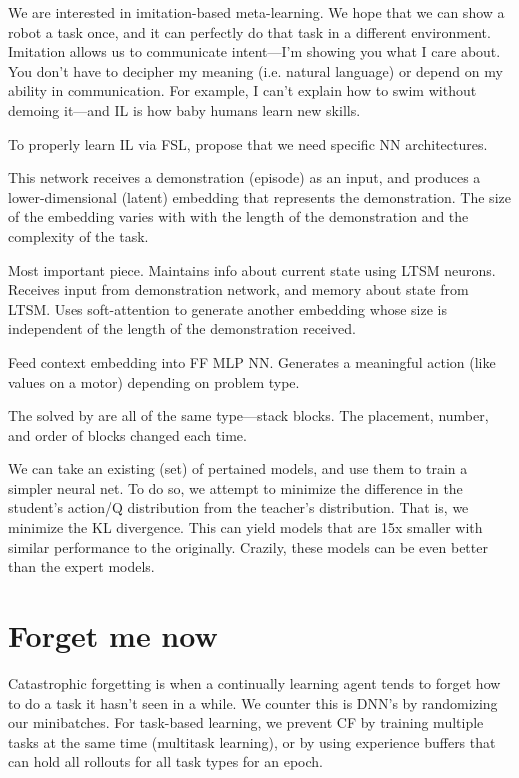 \documentclass[american]{IEEEtran}   	%
\begin{document}
We are interested in imitation-based meta-learning\cite{duan2017oneshot}.
We hope that we can show a robot a task once, and it can perfectly do that task in a different environment.
Imitation allows us to communicate intent---I'm showing you what I care about.
You don't have to decipher my meaning (i.e. natural language) or depend on my ability in communication.
For example, I can't explain how to swim without demoing it---and IL is how baby humans learn new skills.

To properly learn IL via FSL, \cite{duan2017oneshot} propose that we need specific NN architectures.
\begin{description}[leftmargin=1cm, style=nextline]
	\item[Demonstration Network]
	This network receives a demonstration (episode) as an input, and produces a lower-dimensional (latent) embedding that represents the demonstration.
	The size of the embedding varies with with the length of the demonstration and the complexity of the task.
	
	\item[Context Network]
	Most important piece.
	Maintains info about current state using LTSM neurons.
	Receives input from demonstration network, and memory about state from LTSM.
	Uses soft-attention to generate another embedding whose size is independent of the length of the demonstration received.
	
	\item[Manipulation Network]
	Feed context embedding into FF MLP NN.
	Generates a meaningful action (like values on a motor) depending on problem type.
\end{description}

The  solved by \cite{duan2017oneshot} are all of the same type---stack blocks.
The placement, number, and order of blocks changed each time.


We can take an existing (set) of pertained models, and use them to train a simpler neural net\cite{rusu2015policy}.
To do so, we attempt to minimize the difference in the student's action/Q distribution from the teacher's distribution.
That is, we minimize the KL divergence.
This can yield models that are 15x smaller with similar performance to the originally.
Crazily, these  models can be even better than the expert models.



\section{Forget me now}
Catastrophic forgetting is when a continually learning agent tends to forget how to do a task it hasn't seen in a while\cite{Kirkpatrick_2017}.
We counter this is DNN's by randomizing our minibatches.
For task-based learning, we prevent CF by training multiple tasks at the same time (multitask learning), or by using experience buffers that can hold all rollouts for all task types for an epoch\cite{Kirkpatrick_2017,parisotto2015actormimic}. 
\end{document}
